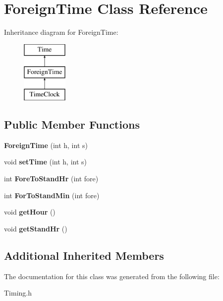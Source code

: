 \hypertarget{class_foreign_time}{\section{Foreign\+Time Class Reference}
\label{class_foreign_time}
}
Inheritance diagram for Foreign\+Time\+:\begin{figure}[H]
\begin{center}
\leavevmode
\includegraphics[height=3.000000cm]{class_foreign_time}
\end{center}
\end{figure}
\subsection*{Public Member Functions}
\begin{DoxyCompactItemize}
\item 
\hypertarget{class_foreign_time_a75e05233ce7712474f132818e441e89e}{{\bfseries Foreign\+Time} (int h, int s)}\label{class_foreign_time_a75e05233ce7712474f132818e441e89e}

\item 
\hypertarget{class_foreign_time_a2337883b85694c788de5a710d5721067}{void {\bfseries set\+Time} (int h, int s)}\label{class_foreign_time_a2337883b85694c788de5a710d5721067}

\item 
\hypertarget{class_foreign_time_a80bcae6da9b1367648f61ea4abd8dacd}{int {\bfseries Fore\+To\+Stand\+Hr} (int fore)}\label{class_foreign_time_a80bcae6da9b1367648f61ea4abd8dacd}

\item 
\hypertarget{class_foreign_time_a9d556acaadddd90891072922fba0ea7f}{int {\bfseries For\+To\+Stand\+Min} (int fore)}\label{class_foreign_time_a9d556acaadddd90891072922fba0ea7f}

\item 
\hypertarget{class_foreign_time_aaf4dd02db171d124570eabc8416ae8e2}{void {\bfseries get\+Hour} ()}\label{class_foreign_time_aaf4dd02db171d124570eabc8416ae8e2}

\item 
\hypertarget{class_foreign_time_a5e03d08c962435df282d97b317e12544}{void {\bfseries get\+Stand\+Hr} ()}\label{class_foreign_time_a5e03d08c962435df282d97b317e12544}

\end{DoxyCompactItemize}
\subsection*{Additional Inherited Members}


The documentation for this class was generated from the following file\+:\begin{DoxyCompactItemize}
\item 
Timing.\+h\end{DoxyCompactItemize}
